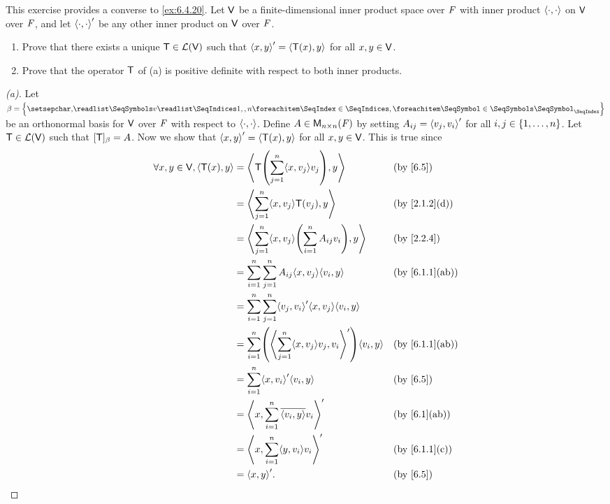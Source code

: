 \begin{ex}\label{ex:6.4.22}
	This exercise provides a converse to \cref{ex:6.4.20}.
	Let \(\mathsf{V}\) be a finite-dimensional inner product space over \(\mathit{F}\) with inner product \(\left\langle\cdot, \cdot\right\rangle\) on \(\mathsf{V}\) over \(\mathit{F}\), and let \(\left\langle\cdot, \cdot\right\rangle'\) be any other inner product on \(\mathsf{V}\) over \(\mathit{F}\).
	\begin{enumerate}
		\item Prove that there exists a unique \(\mathsf{T} \in \mathcal{L}(\mathsf{V})\) such that \(\left\langle x, y\right\rangle' = \left\langle\mathsf{T}(x), y\right\rangle\) for all \(x, y \in \mathsf{V}\).
		\item Prove that the operator \(\mathsf{T}\) of (a) is positive definite with respect to both inner products.
	\end{enumerate}
\end{ex}

\begin{proof}[(a)]
	Let \(\beta = \set{\seq{v}{1,,n}}\) be an orthonormal basis for \(\mathsf{V}\) over \(\mathit{F}\) with respect to \(\left\langle\cdot, \cdot\right\rangle\).
	Define \(A \in \ms[n][n][\F]\) by setting \(A_{i j} = \left\langle v_j, v_i\right\rangle'\) for all \(i, j \in \left\lbrace1, \dots, n\right\rbrace\).
	Let \(\mathsf{T} \in \mathcal{L}(\mathsf{V})\) such that \([\mathsf{T}]_{\beta} = A\).
	Now we show that \(\left\langle x, y\right\rangle' = \left\langle\mathsf{T}(x), y\right\rangle\) for all \(x, y \in \mathsf{V}\).
	This is true since
	\begin{align*}
		\forall x, y \in \V, \inn{\T(x), y} & = \inn{\T\pa{\sum_{j = 1}^n \inn{x, v_j} v_j}, y}                              &  & \by{6.5}       \\
		                                    & = \inn{\sum_{j = 1}^n \inn{x, v_j} \T(v_j), y}                                 &  & \by{2.1.2}[d]  \\
		                                    & = \inn{\sum_{j = 1}^n \inn{x, v_j} \pa{\sum_{i = 1}^n A_{i j} v_i}, y}         &  & \by{2.2.4}     \\
		                                    & = \sum_{i = 1}^n \sum_{j = 1}^n A_{i j} \inn{x, v_j} \inn{v_i, y}              &  & \by{6.1.1}[ab] \\
		                                    & = \sum_{i = 1}^n \sum_{j = 1}^n \inn{v_j, v_i}' \inn{x, v_j} \inn{v_i, y}                          \\
		                                    & = \sum_{i = 1}^n \pa{\inn{\sum_{j = 1}^n \inn{x, v_j} v_j, v_i}'} \inn{v_i, y} &  & \by{6.1.1}[ab] \\
		                                    & = \sum_{i = 1}^n \inn{x, v_i}' \inn{v_i, y}                                    &  & \by{6.5}       \\
		                                    & = \inn{x, \sum_{i = 1}^n \conj{\inn{v_i, y}} v_i}'                             &  & \by{6.1}[ab]   \\
		                                    & = \inn{x, \sum_{i = 1}^n \inn{y, v_i} v_i}'                                    &  & \by{6.1.1}[c]  \\
		                                    & = \inn{x, y}'.                                                                 &  & \by{6.5}
	\end{align*}


\end{proof}
